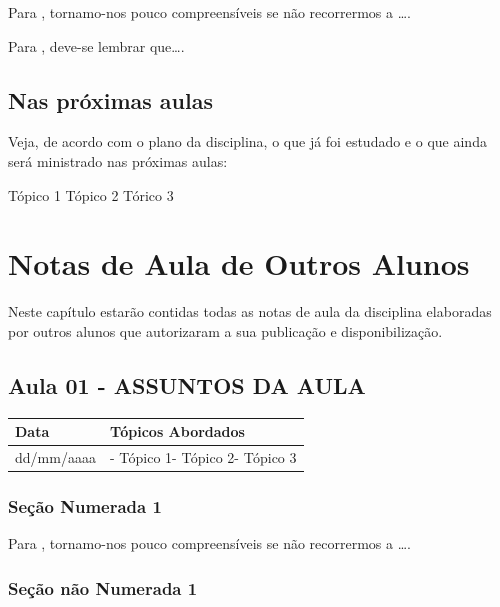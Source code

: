 \documentclass[
]{book}
\begin{document}
Para \citet{BOCK2001}, tornamo-nos pouco compreensíveis se não recorrermos a \ldots.

Para \citet{DAVIDOFF2001}, deve-se lembrar que\ldots.

\hypertarget{nas-pruxf3ximas-aulas}{%
\section{Nas próximas aulas}\label{nas-pruxf3ximas-aulas}}

Veja, de acordo com o plano da disciplina, o que já foi estudado e o que ainda será ministrado nas próximas aulas:

Tópico 1
Tópico 2
Tórico 3

\hypertarget{notas-de-aula-de-outros-alunos}{%
\chapter{Notas de Aula de Outros Alunos}\label{notas-de-aula-de-outros-alunos}}

Neste capítulo estarão contidas todas as notas de aula da disciplina elaboradas por outros alunos que autorizaram a sua publicação e disponibilização.

\hypertarget{aula-01---assuntos-da-aula}{%
\section{Aula 01 - ASSUNTOS DA AULA}\label{aula-01---assuntos-da-aula}}

\begin{longtable}[]{@{}ll@{}}
\toprule()
Data & Tópicos Abordados \\
\midrule()
\endhead
dd/mm/aaaa & - Tópico 1- Tópico 2- Tópico 3 \\
\bottomrule()
\end{longtable}

\hypertarget{seuxe7uxe3o-numerada-1-2}{%
\subsection{Seção Numerada 1}\label{seuxe7uxe3o-numerada-1-2}}

Para \citet{BOCK2001}, tornamo-nos pouco compreensíveis se não recorrermos a \ldots.

\hypertarget{seuxe7uxe3o-nuxe3o-numerada-1-4}{%
\subsection*{Seção não Numerada 1}\label{seuxe7uxe3o-nuxe3o-numerada-1-4}}
\end{document}
